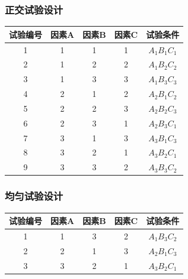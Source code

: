 \documentclass[UTF8]{ctexart}
\begin{document}
\subsubsection{正交试验设计}
\begin{center}
\begin{tabular}{ccccc}
\hline
试验编号 & 因素A & 因素B & 因素C & 试验条件  \\
\hline
1 & 1 & 1 & 1 & $A_1$$B_1$$C_1$ \\
2 & 1 & 2 & 2 & $A_1$$B_2$$C_2$ \\
3 & 1 & 3 & 3 & $A_1$$B_3$$C_3$ \\
4 & 2 & 1 & 2 & $A_2$$B_1$$C_2$ \\
5 & 2 & 2 & 3 & $A_2$$B_2$$C_3$ \\
6 & 2 & 3 & 1 & $A_2$$B_3$$C_1$ \\
7 & 3 & 1 & 3 & $A_3$$B_1$$C_3$ \\
8 & 3 & 2 & 1 & $A_3$$B_2$$C_1$ \\
9 & 3 & 3 & 2 & $A_3$$B_3$$C_2$ \\
\hline
\end{tabular}
\end{center}

\subsubsection{均匀试验设计}
\begin{center}
\begin{tabular}{ccccc}
\hline
试验编号 & 因素A & 因素B & 因素C & 试验条件  \\
\hline
1 & 1 & 3 & 2 & $A_1$$B_3$$C_2$ \\
2 & 2 & 1 & 3 & $A_2$$B_1$$C_3$ \\
3 & 3 & 2 & 1 & $A_3$$B_2$$C_1$ \\
\hline
\end{tabular}
\end{center}
\end{document}
